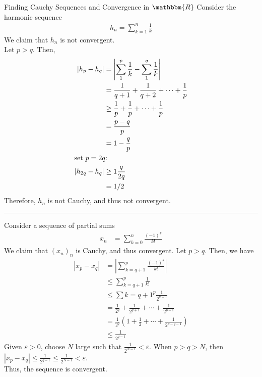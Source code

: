 \documentclass[10pt]{extarticle}
\newcommand{\R}{\mathbbm{R}}
\begin{document}
  \begin{problem}{Finding Cauchy Sequences and Convergence in $\R$}
    Consider the harmonic sequence
    \begin{align*}
      h_n = \sum_{k=1}^{n}\frac{1}{k}
    \end{align*}
    We claim that $h_n$ is not convergent.\\

    Let $p > q$. Then,
    \begin{align*}
      \left|h_p-h_q\right| &= \left|\sum_{1}^{p}\frac{1}{k} - \sum_{1}^{q}\frac{1}{k}\right|\\
                           &= \frac{1}{q+1} + \frac{1}{q+2} + \cdots + \frac{1}{p}\\
                           &\geq \frac{1}{p} + \frac{1}{p} + \cdots + \frac{1}{p}\\
                           &= \frac{p-q}{p} \\
                           &= 1-\frac{q}{p}\\
                           \shortintertext{set $p = 2q$:}
      \left|h_{2q}-h_q\right| &\geq 1\frac{q}{2q}\\
                              &= 1/2
    \end{align*}
    Therefore, $h_n$ is not Cauchy, and thus not convergent.\\
    \vspace{4pt}
    \rule{\textwidth}{0.4pt}
    \vspace{4pt}
    Consider a sequence of partial sums
    \begin{align*}
      x_n &= \sum_{k=0}^{n} \frac{(-1)^k}{k!}
    \end{align*}
    We claim that $(x_n)_n$ is Cauchy, and thus convergent. Let $p > q$. Then, we have
    \begin{align*}
      \left|x_p-x_q\right| &= \left|\sum_{k=q+1}^{p}\frac{(-1)^k}{k!}\right|\\
                           &\leq \sum_{k=q+1}^{p}\frac{1}{k!}\\
                           &\leq \sum{k=q+1}^{p}\frac{1}{2^{k-1}}\\
                           &= \frac{1}{2^q} + \frac{1}{2^{q+1}} + \cdots + \frac{1}{2^{p-1}}\\
                           &= \frac{1}{2^q}\left(1 + \frac{1}{2} + \cdots + \frac{1}{2^{p-q-1}}\right)\\
                           &\leq \frac{1}{2^{q-1}}
    \end{align*}
    Given $\varepsilon > 0$, choose $N$ large such that $\displaystyle \frac{1}{2^{N-1}} < \varepsilon$. When $p > q > N$, then $\displaystyle|x_p-x_q| \leq \frac{1}{2^{q-1}} \leq \frac{1}{2^{N-1}} < \varepsilon$.\\

    Thus, the sequence is convergent.
  \end{problem}
\end{document}
